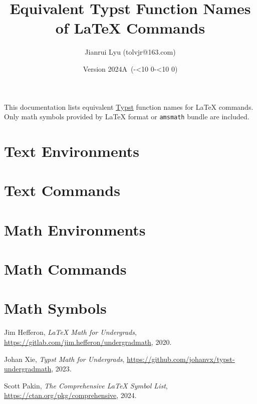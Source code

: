 \documentclass[oneside,11pt]{article}
\newcommand*{\myversion}{2024A}
\newcommand*{\mydate}{Version \myversion\ (\the\year-\mylpad\month-\mylpad\day)}
\newcommand*{\mylpad}[1]{\ifnum#1<10 0\the#1\else\the#1\fi}
\begin{document}
\title{\textsf{\color{green3}Equivalent Typst Function Names of LaTeX Commands}}
\author{Jianrui Lyu (tolvjr@163.com)}
\date{\mydate}
\maketitle

This documentation lists equivalent \href{https://typst.app}{Typst} function names for LaTeX commands.
Only math symbols provided by LaTeX format or \texttt{amsmath} bundle are included.

\tableofcontents

\section{Text Environments}


\section{Text Commands}


\section{Math Environments}


\section{Math Commands}


\section{Math Symbols}


\begin{thebibliography}{9}

  Jim Hefferon,
  \textit{LaTeX Math for Undergrads},
  \url{https://gitlab.com/jim.hefferon/undergradmath},
  2020.

  Johan Xie,
  \textit{Typst Math for Undergrads},
  \url{https://github.com/johanvx/typst-undergradmath},
  2023.

  Scott Pakin,
  \textit{The Comprehensive LaTeX Symbol List},
  \url{https://ctan.org/pkg/comprehensive},
  2024.

\end{thebibliography}
\end{document}
